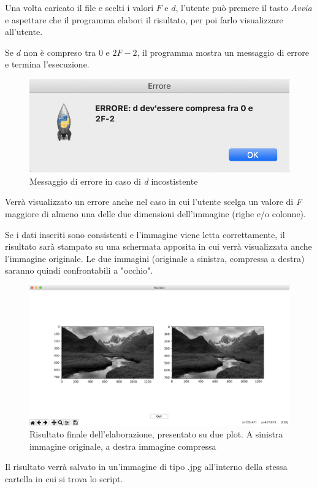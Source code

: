 \documentclass[preprint,12pt]{elsarticle}
\begin{document}
Una volta caricato il file e scelti i valori $F$ e $d$, l'utente può premere il tasto \textit{Avvia} e aspettare che il programma elabori il risultato, per poi farlo visualizzare all'utente.

Se $d$ non è compreso tra $0$ e $2F-2$, il programma mostra un messaggio di errore e termina l'esecuzione.
\begin{figure}[H]
	\centering
	\includegraphics[width=0.55\linewidth]{errore}
	\caption{Messaggio di errore in caso di \textit{d} incostistente} 
\end{figure}

Verrà visualizzato un errore anche nel caso in cui l'utente scelga un valore di \textit{F} maggiore di almeno una delle due dimensioni dell'immagine (righe e/o colonne).

\newpage

Se i dati inseriti sono consistenti e l'immagine viene letta correttamente, il risultato sarà stampato su una schermata apposita in cui verrà visualizzata anche l'immagine originale.
Le due immagini (originale a sinistra, compressa a destra) saranno quindi confrontabili a "occhio".

\begin{figure}[H]
	\centering
	\includegraphics[width=1\linewidth]{risultato}
	\caption{Risultato finale dell'elaborazione, presentato su due plot. A sinistra immagine originale, a destra immagine compressa}
\end{figure}

Il risultato verrà salvato in un'immagine di tipo .jpg all'interno della stessa cartella in cui si trova lo script.
\end{document}
